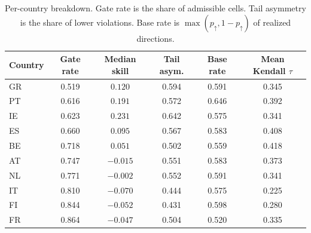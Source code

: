 \begin{table}[t]
\centering
\caption{Per-country breakdown. Gate rate is the share of admissible cells. Tail asymmetry is the share of lower violations. Base rate is $\max(p_{\uparrow},1-p_{\uparrow})$ of realized directions.}
\label{tab:app_country}
\begin{tabular}{lccccc}
\toprule
Country & Gate rate & Median skill & Tail asym. & Base rate & Mean Kendall $\tau$ \\
\midrule
GR & 0.519 & $ 0.120$ & 0.594 & 0.591 & 0.345 \\
PT & 0.616 & $ 0.191$ & 0.572 & 0.646 & 0.392 \\
IE & 0.623 & $ 0.231$ & 0.642 & 0.575 & 0.341 \\
ES & 0.660 & $ 0.095$ & 0.567 & 0.583 & 0.408 \\
BE & 0.718 & $ 0.051$ & 0.502 & 0.559 & 0.418 \\
AT & 0.747 & $-0.015$ & 0.551 & 0.583 & 0.373 \\
NL & 0.771 & $-0.002$ & 0.552 & 0.591 & 0.341 \\
IT & 0.810 & $-0.070$ & 0.444 & 0.575 & 0.225 \\
FI & 0.844 & $-0.052$ & 0.431 & 0.598 & 0.280 \\
FR & 0.864 & $-0.047$ & 0.504 & 0.520 & 0.335 \\
\bottomrule
\end{tabular}
\end{table}

